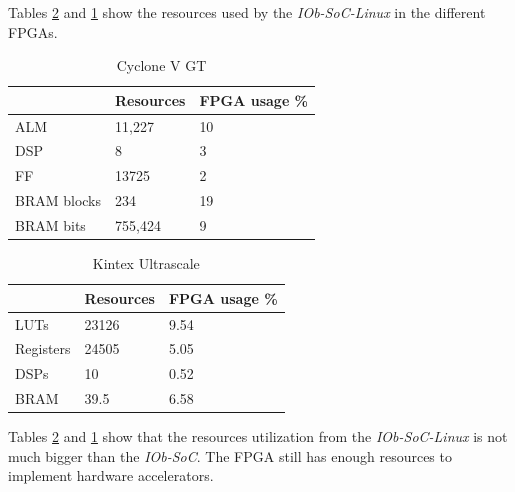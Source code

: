 Tables \ref{tab:kintex_linux} and \ref{tab:cyclone_linux} show the resources used by the \textit{IOb-SoC-Linux} in the different FPGAs.

\begin{table}[!ht]
    \centering
    \begin{tabular}{l|l|l|}
        \cline{2-3}
                                            & Resources & FPGA usage \% \\ \hline
        \multicolumn{1}{|l|}{ALM}         & 11,227    & 10                       \\ \hline
        \multicolumn{1}{|l|}{DSP}         & 8         & 3                        \\ \hline
        \multicolumn{1}{|l|}{FF}          & 13725     & 2                        \\ \hline
        \multicolumn{1}{|l|}{BRAM blocks} & 234       & 19                       \\ \hline
        \multicolumn{1}{|l|}{BRAM bits}   & 755,424   & 9                        \\ \hline
    \end{tabular}
    \caption{Cyclone V GT}
    \label{tab:cyclone_linux}
\end{table}
\begin{table}[!ht]
    \centering
    \begin{tabular}{l|l|l|}
        \cline{2-3}
                                        & Resources & FPGA usage \% \\ \hline
        \multicolumn{1}{|l|}{LUTs}      & 23126     & 9.54                     \\ \hline
        \multicolumn{1}{|l|}{Registers} & 24505     & 5.05                     \\ \hline
        \multicolumn{1}{|l|}{DSPs}      & 10        & 0.52                     \\ \hline
        \multicolumn{1}{|l|}{BRAM}      & 39.5      & 6.58                     \\ \hline
    \end{tabular}
    \caption{Kintex Ultrascale}
    \label{tab:kintex_linux}
\end{table}

Tables \ref{tab:kintex_linux} and \ref{tab:cyclone_linux} show that the resources utilization from the \textit{IOb-SoC-Linux} is not much bigger than the \textit{IOb-SoC}. The FPGA still has enough resources to implement hardware accelerators.
